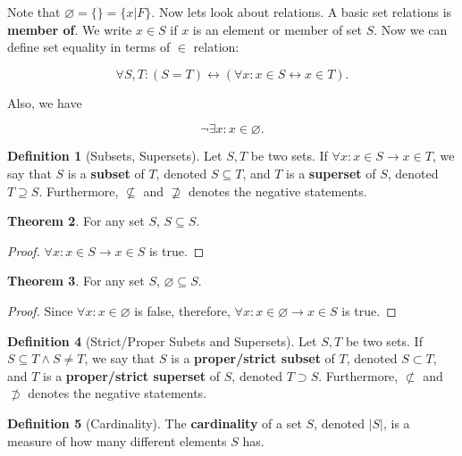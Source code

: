 \documentclass[12pt,a4paper]{report}
\theoremstyle{definition}
\newtheorem{theorem}{Theorem}[section]
\newtheorem{definition}[theorem]{Definition}
\theoremstyle{remark}
\begin{document}
Note that $\varnothing = \{\} = \{x | F\}.$ Now lets look about relations. A basic set relations is \textbf{member of}. We write $x \in S$ if $x$ is an element or member of set $S$. Now we can define set equality in terms of $\in$ relation:

\[\forall S, T: (S = T) \leftrightarrow (\forall x: x \in S \leftrightarrow x \in T).\]

Also, we have 

\[\neg \exists x: x \in \varnothing.\]

\begin{definition}[Subsets, Supersets]
    Let $S, T$ be two sets. If $\forall x: x \in S \to x \in T$, we say that $S$ is a \textbf{subset} of $T$, denoted $S \subseteq T$, and $T$ is a \textbf{superset} of $S$, denoted $T \supseteq S.$ Furthermore, $\not\subseteq$ and $\not\supseteq$ denotes the negative statements.
\end{definition}

\begin{theorem}
    For any set $S$, $S \subseteq S.$
\end{theorem}

\begin{proof}
    $\forall x: x \in S \to x \in S$ is true.
\end{proof}

\begin{theorem}
    For any set $S$, $\varnothing \subseteq S.$ 
\end{theorem}

\begin{proof}
    Since $\forall x: x \in \varnothing$ is false, therefore, $\forall x: x \in \varnothing \to x \in S$ is true.
\end{proof}

\begin{definition}[Strict/Proper Subets and Supersets]
    Let $S, T$ be two sets. If $S \subseteq T \land S \neq T$, we say that $S$ is a \textbf{proper/strict subset} of $T$, denoted $S \subset T$, and $T$ is a \textbf{proper/strict superset} of $S$, denoted $T \supset S.$ Furthermore, $\not\subset$ and $\not\supset$ denotes the negative statements.
\end{definition}

\begin{definition}[Cardinality]
    The \textbf{cardinality} of a set $S$, denoted $|S|$, is a measure of how many different elements $S$ has.
\end{definition}
\end{document}

